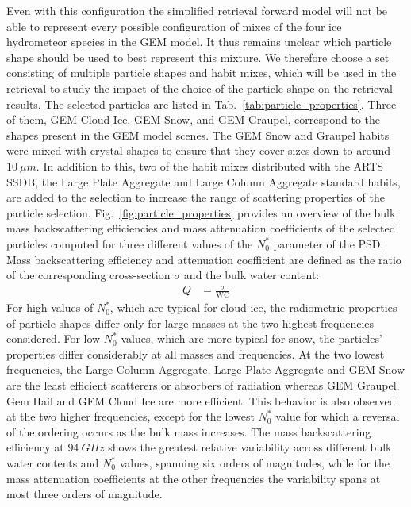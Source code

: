 \documentclass[journal abbreviation, manuscript]{copernicus}
\begin{document}
Even with this configuration the simplified retrieval forward model will not be
able to represent every possible configuration of mixes of the four ice
hydrometeor species in the GEM model. It thus remains unclear which particle
shape should be used to best represent this mixture. We therefore choose a set
consisting of multiple particle shapes and habit mixes, which will be used in
the retrieval to study the impact of the choice of the particle shape on the
retrieval results. The selected particles are listed in
Tab.~\ref{tab:particle_properties}. Three of them, GEM Cloud Ice, GEM Snow, and
GEM Graupel, correspond to the shapes present in the GEM model scenes. The GEM
Snow and Graupel habits were mixed with crystal shapes to ensure that they cover
sizes down to around $10\ \unit{\mu m}$. In addition to this, two of the habit
mixes distributed with the ARTS SSDB, the Large Plate Aggregate and Large Column
Aggregate standard habits, are added to the selection to increase the range of
scattering properties of the particle selection.
Fig.~\ref{fig:particle_properties} provides an overview of the bulk mass
backscattering efficiencies and mass attenuation coefficients of the selected
particles computed for three different values of the $N_0^*$ parameter of the
PSD. Mass backscattering efficiency and attenuation coefficient are defined as
the ratio of the corresponding cross-section $\sigma$ and the bulk water
content: 
\begin{align}
  Q &= \frac{\sigma}{\text{WC}}
\end{align}
For high values of $N_0^*$, which are typical for cloud ice, the radiometric
properties of particle shapes differ only for large masses at the two highest
frequencies considered. For low $N_0^*$ values, which are more typical for snow,
the particles' properties differ considerably at all masses and frequencies. At
the two lowest frequencies, the Large Column Aggregate, Large Plate Aggregate
and GEM Snow are the least efficient scatterers or absorbers of radiation
whereas GEM Graupel, Gem Hail and GEM Cloud Ice are more efficient. This
behavior is also observed at the two higher frequencies, except for the lowest
$N_0^*$ value for which a reversal of the ordering occurs as the bulk mass
increases. The mass backscattering efficiency at $94\ \unit{GHz}$ shows the
greatest relative variability across different bulk water contents and $N_0^*$
values, spanning six orders of magnitudes, while for the mass attenuation
coefficients at the other frequencies the variability spans at most three orders
of magnitude.
\end{document}
